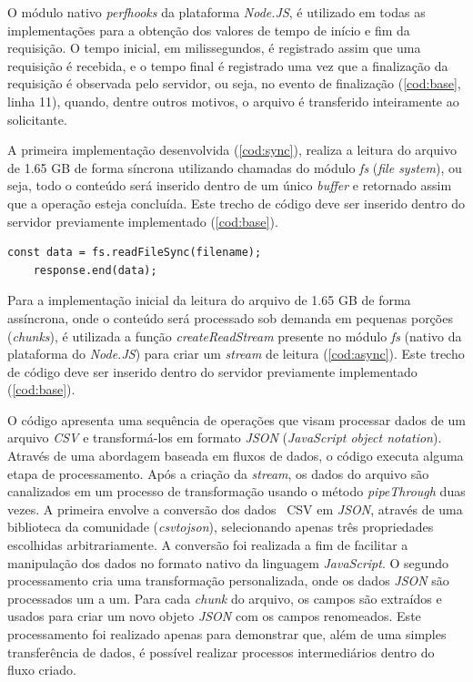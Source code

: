 \documentclass[12pt]{article}
\begin{document}
O módulo nativo \textit{perf\textunderscore hooks} da plataforma \textit{Node.JS}, é utilizado em todas as implementações para a obtenção 
dos valores de tempo de início e fim da requisição. O tempo inicial, em milissegundos, é registrado assim que uma requisição é recebida, 
e o tempo final é registrado uma vez que a finalização da requisição é observada pelo servidor, ou seja, no evento de finalização (\autoref{cod:base}, linha 11),
quando, dentre outros motivos, o arquivo é transferido inteiramente ao solicitante.

A primeira implementação desenvolvida (\autoref{cod:sync}), realiza a leitura do arquivo de 1.65 GB
de forma síncrona utilizando chamadas do módulo \textit{fs} (\textit{file system}), ou seja, todo o conteúdo será
inserido dentro de um único \textit{buffer} e retornado assim que a operação esteja concluída. Este trecho de código
deve ser inserido dentro do servidor previamente implementado (\autoref{cod:base}).

\begin{lstlisting}[caption={Implementação da leitura do arquivo de forma síncrona}, label=cod:sync]
	const data = fs.readFileSync(filename);
	response.end(data);
\end{lstlisting}

Para a implementação inicial da leitura do arquivo de 1.65 GB de forma assíncrona,
onde o conteúdo será processado sob demanda em pequenas porções (\textit{chunks}), é utilizada
a função \textit{createReadStream} presente no módulo \textit{fs} (nativo da plataforma do \textit{Node.JS}) para
criar um \textit{stream} de leitura (\autoref{cod:async}). Este trecho de código deve ser inserido dentro do servidor previamente 
implementado (\autoref{cod:base}).

O código apresenta uma sequência de operações que visam processar dados de um arquivo \textit{CSV} e 
transformá-los em formato \textit{JSON} (\textit{JavaScript object notation}). Através de uma abordagem baseada 
em fluxos de dados, o código executa alguma etapa de processamento. Após a criação da \textit{stream}, 
os dados do arquivo são canalizados em um processo de 
transformação usando o método \textit{pipeThrough} duas vezes. A primeira envolve a 
conversão dos dados \
{CSV} em \textit{JSON}, através de uma biblioteca da comunidade (\textit{csvtojson}), 
selecionando apenas três propriedades escolhidas arbitrariamente. A conversão foi realizada a fim de facilitar
a manipulação dos dados no formato nativo da linguagem \textit{JavaScript}. O segundo processamento cria uma 
transformação personalizada, onde os dados \textit{JSON} são processados um a um. 
Para cada \textit{chunk} do arquivo, os campos são extraídos e usados para criar um novo objeto 
\textit{JSON} com os campos renomeados. Este processamento foi realizado apenas para demonstrar que, além de uma simples
transferência de dados, é possível realizar processos intermediários dentro do fluxo criado.
\end{document}

